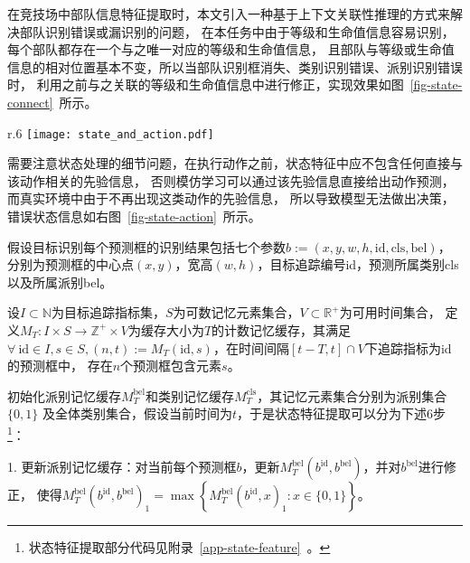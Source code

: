在竞技场中部队信息特征提取时，本文引入一种基于上下文关联性推理的方式来解决部队识别错误或漏识别的问题，
在本任务中由于等级和生命值信息容易识别，每个部队都存在一个与之唯一对应的等级和生命值信息，
且部队与等级或生命值信息的相对位置基本不变，所以当部队识别框消失、类别识别错误、派别识别错误时，
利用之前与之关联的等级和生命值信息中进行修正，实现效果如图~\ref{fig-state-connect}~所示。
\vspace{-3.5ex}
\begin{wrapfigure}[11]{r}{.6\textwidth} %
  \centering
  \texttt{[image: state\_and\_action.pdf]}
  \caption{动作直接导致的错误状态先验信息：第1帧中目标识别错误识别到未部署的部队状态；
  第2帧中OCR识别器在目标识别识别到动作之前，产生了错误的总圣水识别信息，因此需要将动作帧提前到该帧之前；
  第3帧中目标识别成功识别到圣水动画，可以判断玩家在该时刻之前部署了部队。}
  \label{fig-state-action}
\end{wrapfigure}

需要注意状态处理的细节问题，在执行动作之前，状态特征中应不包含任何直接与该动作相关的先验信息，
否则模仿学习可以通过该先验信息直接给出动作预测，而真实环境中由于不再出现这类动作的先验信息，
所以导致模型无法做出决策，错误状态信息如右图~\ref{fig-state-action}~所示。

假设目标识别每个预测框的识别结果包括七个参数$b:=(x,y,w,h,\text{id},\text{cls},\text{bel})$，
分别为预测框的中心点$(x,y)$，宽高$(w,h)$，目标追踪编号id，预测所属类别cls以及所属派别bel。

\begin{definition}[计数记忆缓存]
  设$I\subset \mathbb{N}$为目标追踪指标集，$S$为可数记忆元素集合，$V\subset \mathbb{R}^+$为可用时间集合，
  定义$M_{T}:I\times S\to\mathbb{Z}^+\times V$为缓存大小为$T$的计数记忆缓存，其满足
  $\forall~ \text{id}\in I, s\in S, (n,t):=M_T(\text{id},s)$，在时间间隔$[t-T,t]\cap V$下追踪指标为id的预测框中，
  存在$n$个预测框包含元素$s$。
\end{definition}

初始化派别记忆缓存$M_{T}^{\text{bel}}$和类别记忆缓存$M_{T}^{\text{cls}}$，其记忆元素集合分别为派别集合$\{0,1\}$
及全体类别集合，假设当前时间为$t$，于是状态特征提取可以分为下述6步\footnote{状态特征提取部分代码见附录~\ref{app-state-feature}~。}：

1. 更新派别记忆缓存：对当前每个预测框$b$，更新$M_{T}^{\text{bel}}(b^{\text{id}}, b^{\text{bel}})$，并对$b^{\text{bel}}$进行修正，
使得$M_T^{\text{bel}}(b^{\text{id}}, b^{\text{bel}})_1 = \max\left\{M_T^{\text{bel}}(b^{\text{id}},x)_1:x\in\{0,1\}\right\}$。

